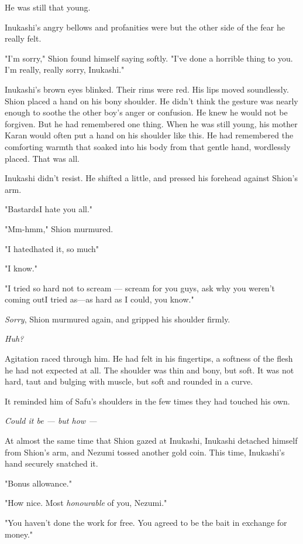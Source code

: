He was still that young.

Inukashi's angry bellows and profanities were but the other side of the
fear he really felt.

"I'm sorry," Shion found himself saying softly. "I've done a horrible
thing to you. I'm really, really sorry, Inukashi."

Inukashi's brown eyes blinked. Their rims were red. His lips moved
soundlessly. Shion placed a hand on his bony shoulder. He didn't think
the gesture was nearly enough to soothe the other boy's anger or
confusion. He knew he would not be forgiven. But he had remembered one
thing. When he was still young, his mother Karan would often put a hand
on his shoulder like this. He had remembered the comforting warmth that
soaked into his body from that gentle hand, wordlessly placed. That was
all.

Inukashi didn't resist. He shifted a little, and pressed his forehead
against Shion's arm.

"Bastards\el I hate you all."

"Mm-hmm," Shion murmured.

"I hated\el hated it, so much\el "

"I know."

"I tried so hard not to scream --- scream for you guys, ask why you
weren't coming out\el I tried as---as hard as I could, you know."

\emph{Sorry}, Shion murmured again, and gripped his shoulder firmly.

\emph{Huh?}

Agitation raced through him. He had felt in his fingertips, a softness
of the flesh he had not expected at all. The shoulder was thin and bony,
but soft. It was not hard, taut and bulging with muscle, but soft and
rounded in a curve.

It reminded him of Safu's shoulders in the few times they had touched
his own.

\emph{Could it be --- but how ---}

At almost the same time that Shion gazed at Inukashi, Inukashi detached
himself from Shion's arm, and Nezumi tossed another gold coin. This
time, Inukashi's hand securely snatched it.

"Bonus allowance."

"How nice. Most \emph{honourable} of you, Nezumi."

"You haven't done the work for free. You agreed to be the bait in
exchange for money."

